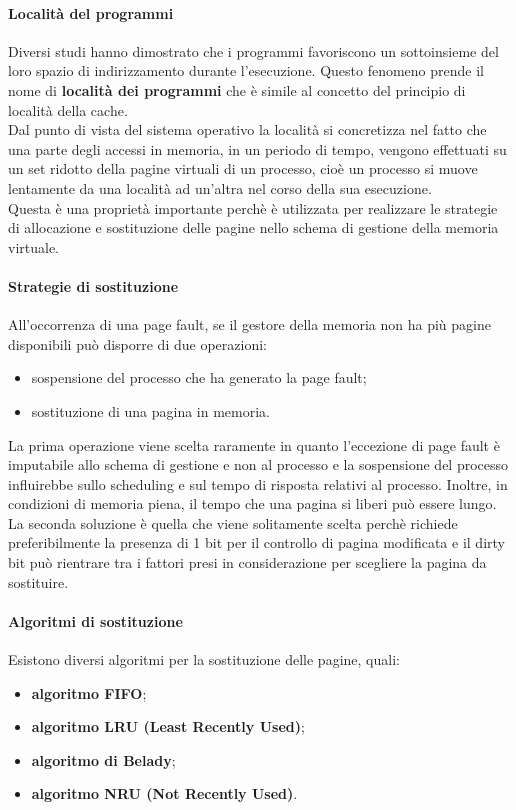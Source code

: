 \documentclass[12pt, letterpaper]{report}
\begin{document}
	\paragraph{Località del programmi} Diversi studi hanno dimostrato che i programmi favoriscono un sottoinsieme del loro spazio di indirizzamento durante l'esecuzione. Questo fenomeno prende il nome di \textbf{località dei programmi} che è simile al concetto del principio di località della cache. \\
	Dal punto di vista del sistema operativo la località si concretizza nel fatto che una parte degli accessi in memoria, in un periodo di tempo, vengono effettuati su un set ridotto della pagine virtuali di un processo, cioè un processo si muove lentamente da una località ad un'altra nel corso della sua esecuzione. \\
	Questa è una proprietà importante perchè è utilizzata per realizzare le strategie di allocazione e sostituzione delle pagine nello schema di gestione della memoria virtuale.
	\paragraph{Strategie di sostituzione} All'occorrenza di una page fault, se il gestore della memoria non ha più pagine disponibili può disporre di due operazioni:
	\begin{itemize}
		\item sospensione del processo che ha generato la page fault;
		\item sostituzione di una pagina in memoria.
	\end{itemize}
	La prima operazione viene scelta raramente in quanto l'eccezione di page fault è imputabile allo schema di gestione e non al processo e la sospensione del processo influirebbe sullo scheduling e sul tempo di risposta relativi al processo. Inoltre, in condizioni di memoria piena, il tempo che una pagina si liberi può essere lungo. \\
	La seconda soluzione è quella che viene solitamente scelta perchè richiede preferibilmente la presenza di 1 bit per il controllo di pagina modificata e il dirty bit può rientrare tra i fattori presi in considerazione per scegliere la pagina da sostituire.
	\paragraph{Algoritmi di sostituzione} Esistono diversi algoritmi per la sostituzione delle pagine, quali:
	\begin{itemize}
		\item \textbf{algoritmo FIFO};
		\item \textbf{algoritmo LRU (Least Recently Used)};
		\item \textbf{algoritmo di Belady};
		\item \textbf{algoritmo NRU (Not Recently Used)}.
	\end{itemize}
\end{document}

